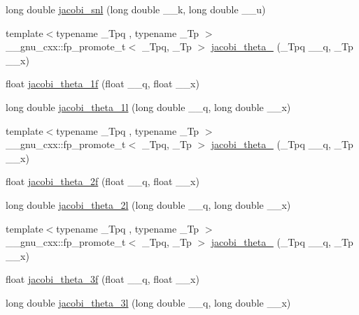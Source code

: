 \begin{DoxyCompactItemize}
\item 
long double \hyperlink{group__gnu__math__spec__func_ga1c13539e3b051a07b1c28aa8a0aeb1b4}{jacobi\+\_\+snl} (long double \+\_\+\+\_\+k, long double \+\_\+\+\_\+u)
\item 
{\footnotesize template$<$typename \+\_\+\+Tpq , typename \+\_\+\+Tp $>$ }\\\+\_\+\+\_\+gnu\+\_\+cxx\+::fp\+\_\+promote\+\_\+t$<$ \+\_\+\+Tpq, \+\_\+\+Tp $>$ \hyperlink{group__gnu__math__spec__func_ga996ca8c1fff75e2d4f196e99e0919933}{jacobi\+\_\+theta\+\_} (\+\_\+\+Tpq \+\_\+\+\_\+q, \+\_\+\+Tp \+\_\+\+\_\+x)
\item 
float \hyperlink{group__gnu__math__spec__func_gacccd2107c26e39400e589a59e0af674a}{jacobi\+\_\+theta\+\_\+1f} (float \+\_\+\+\_\+q, float \+\_\+\+\_\+x)
\item 
long double \hyperlink{group__gnu__math__spec__func_ga823eba555ecac89556a0f4c1e62dbc5a}{jacobi\+\_\+theta\+\_\+1l} (long double \+\_\+\+\_\+q, long double \+\_\+\+\_\+x)
\item 
{\footnotesize template$<$typename \+\_\+\+Tpq , typename \+\_\+\+Tp $>$ }\\\+\_\+\+\_\+gnu\+\_\+cxx\+::fp\+\_\+promote\+\_\+t$<$ \+\_\+\+Tpq, \+\_\+\+Tp $>$ \hyperlink{group__gnu__math__spec__func_gaf6b13dac1f112a870299d75cb4cf42cc}{jacobi\+\_\+theta\+\_} (\+\_\+\+Tpq \+\_\+\+\_\+q, \+\_\+\+Tp \+\_\+\+\_\+x)
\item 
float \hyperlink{group__gnu__math__spec__func_gaa99e91c0753410a42b57cbf417cf7ea0}{jacobi\+\_\+theta\+\_\+2f} (float \+\_\+\+\_\+q, float \+\_\+\+\_\+x)
\item 
long double \hyperlink{group__gnu__math__spec__func_ga2db5cb3025b9068e79dc7aa21bc9af5b}{jacobi\+\_\+theta\+\_\+2l} (long double \+\_\+\+\_\+q, long double \+\_\+\+\_\+x)
\item 
{\footnotesize template$<$typename \+\_\+\+Tpq , typename \+\_\+\+Tp $>$ }\\\+\_\+\+\_\+gnu\+\_\+cxx\+::fp\+\_\+promote\+\_\+t$<$ \+\_\+\+Tpq, \+\_\+\+Tp $>$ \hyperlink{group__gnu__math__spec__func_gaf4eac2990db1dadba66ae688ceaa6403}{jacobi\+\_\+theta\+\_} (\+\_\+\+Tpq \+\_\+\+\_\+q, \+\_\+\+Tp \+\_\+\+\_\+x)
\item 
float \hyperlink{group__gnu__math__spec__func_ga6ff9738978be029e90e1f144ab4aa165}{jacobi\+\_\+theta\+\_\+3f} (float \+\_\+\+\_\+q, float \+\_\+\+\_\+x)
\item 
long double \hyperlink{group__gnu__math__spec__func_ga313109bbf08d81e93196eb73c2047dd2}{jacobi\+\_\+theta\+\_\+3l} (long double \+\_\+\+\_\+q, long double \+\_\+\+\_\+x)

\end{DoxyCompactItemize}
